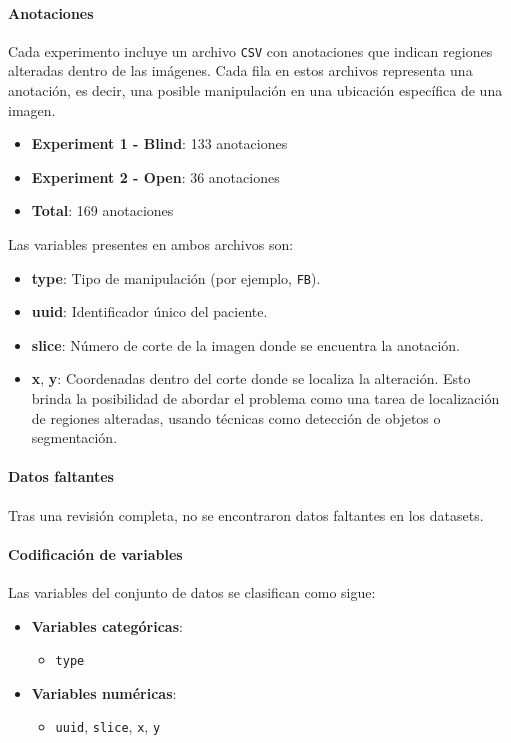 \documentclass[conference]{IEEEtran}
\begin{document}
\paragraph{Anotaciones}
Cada experimento incluye un archivo \texttt{CSV} con anotaciones que indican regiones alteradas dentro de las imágenes. Cada fila en estos archivos representa una anotación, es decir, una posible manipulación en una ubicación específica de una imagen.

\begin{itemize}
    \item \textbf{Experiment 1 - Blind}: 133 anotaciones
    \item \textbf{Experiment 2 - Open}: 36 anotaciones
    \item \textbf{Total}: 169 anotaciones
\end{itemize}

Las variables presentes en ambos archivos son:

\begin{itemize}
    \item \textbf{type}: Tipo de manipulación (por ejemplo, \texttt{FB}).
    \item \textbf{uuid}: Identificador único del paciente.
    \item \textbf{slice}: Número de corte de la imagen donde se encuentra la anotación.
    \item \textbf{x}, \textbf{y}: Coordenadas dentro del corte donde se localiza la alteración. Esto brinda la posibilidad de abordar el problema como una tarea de localización de regiones alteradas, usando técnicas como detección de objetos o segmentación.
\end{itemize}


\paragraph{Datos faltantes}
Tras una revisión completa, no se encontraron datos faltantes en los datasets. 

\paragraph{Codificación de variables}

Las variables del conjunto de datos se clasifican como sigue:

\begin{itemize}
    \item \textbf{Variables categóricas}:
        \begin{itemize}
            \item \texttt{type}
        \end{itemize}
    \item \textbf{Variables numéricas}:
        \begin{itemize}
            \item \texttt{uuid}, \texttt{slice}, \texttt{x}, \texttt{y}
        \end{itemize}
\end{itemize}
\end{document}
